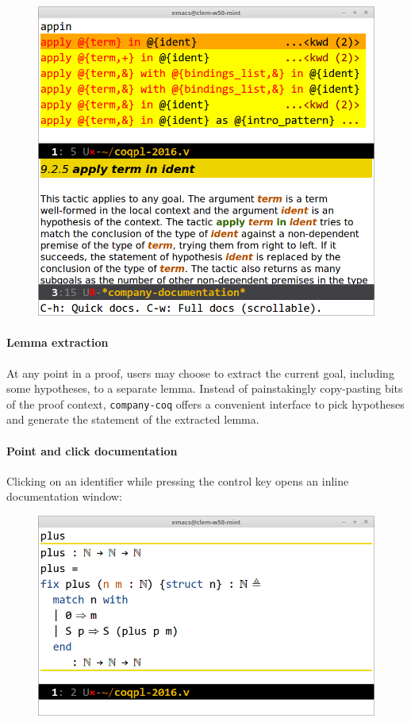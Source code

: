 \documentclass[preprint]{sigplanconf}
\begin{document}
\begin{figure}[H]
  \centering
  \includegraphics[width=\linewidth]{docs-xxl-2.png}
\end{figure}

\paragraph{Lemma extraction} At any point in a proof, users may choose to extract the current goal, including some hypotheses, to a separate lemma. Instead of painstakingly copy-pasting bits of the proof context, \texttt{company-coq} offers a convenient interface to pick hypotheses and generate the statement of the extracted lemma.

\paragraph{Point and click documentation} Clicking on an identifier while pressing the control key opens an inline documentation window:

\begin{figure}[H]
  \centering
  \includegraphics[width=\linewidth]{inline-docs-xxl-2.png}
\end{figure}
\end{document}
